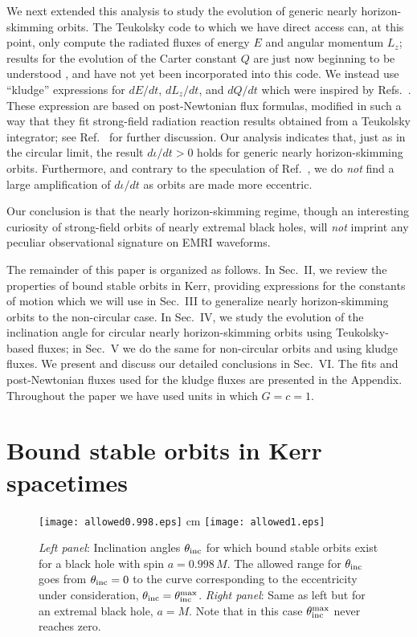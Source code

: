 \documentclass[aps,prd,twocolumn,showpacs,groupedaddress,nofootinbib]{revtex4}
\begin{document}
We next extended this analysis to study the evolution of generic
nearly horizon-skimming orbits.  The Teukolsky code to which we have
direct access can, at this point, only compute the radiated fluxes of
energy $E$ and angular momentum $L_z$; results for the evolution of
the Carter constant $Q$ are just now beginning to be understood
{\cite{sago}}, and have not yet been incorporated into this code.  We
instead use ``kludge'' expressions for $dE/dt$, $dL_z/dt$, and $dQ/dt$
which were inspired by Refs.\ {\cite{kludge_hughes,
GG_kludge_fluxes}}.  These expression are based on post-Newtonian flux
formulas, modified in such a way that they fit strong-field radiation
reaction results obtained from a Teukolsky integrator; see Ref.\
{\cite{GG_kludge_fluxes}} for further discussion.  Our analysis
indicates that, just as in the circular limit, the result $d\iota/dt >
0$ holds for generic nearly horizon-skimming orbits.  Furthermore, and
contrary to the speculation of Ref.\ {\cite{skimming}}, we do {\it
not} find a large amplification of $d\iota/dt$ as orbits are made more
eccentric.

Our conclusion is that the nearly horizon-skimming regime, though an
interesting curiosity of strong-field orbits of nearly extremal black
holes, will {\it not} imprint any peculiar observational signature on
EMRI waveforms.

The remainder of this paper is organized as follows. In Sec.\ II, we
review the properties of bound stable orbits in Kerr, providing
expressions for the constants of motion which we will use in Sec.\ III
to generalize nearly horizon-skimming orbits to the non-circular
case. In Sec.\ IV, we study the evolution of the inclination angle for
circular nearly horizon-skimming orbits using Teukolsky-based fluxes;
in Sec.\ V we do the same for non-circular orbits and using kludge
fluxes.  We present and discuss our detailed conclusions in Sec.\ VI.
The fits and post-Newtonian fluxes used for the kludge fluxes are
presented in the Appendix. Throughout the paper we have used units in
which $G = c = 1$.

\section{\label{sec:constants_of_motion} Bound stable orbits in Kerr
  spacetimes} 


\begin{figure*}
\texttt{[image: allowed0.998.eps]}
 cm
\texttt{[image: allowed1.eps]}
\caption{\textit{Left panel}: 
Inclination angles $\theta_{\rm inc}$ for which bound stable
orbits exist for a black hole with spin $a = 0.998\,M$. The allowed
range for $\theta_{\rm inc}$ goes from $\theta_{\rm inc}=0$ to the
curve corresponding to the eccentricity under consideration,
$\theta_{\rm inc}=\theta_{\rm inc}^{\rm max}$.
\textit{Right panel}:
Same as left but for an extremal black
hole, $a=M$. Note that in this case $\theta_{\rm inc}^{\rm max}$
never reaches zero.}
\label{fig:allowed}
\end{figure*}
\end{document}
